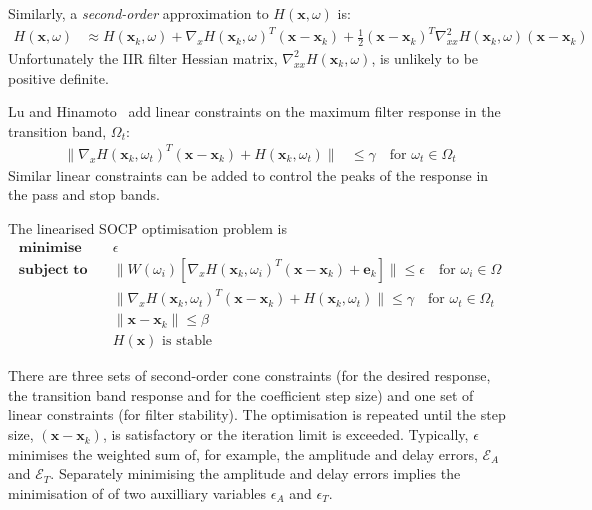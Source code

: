 \documentclass[a4paper,twoside,10pt,english]{report}
\begin{document}
Similarly, a \emph{second-order} approximation to 
$H\left(\boldsymbol{x},\omega\right)$ is:
\begin{align*}
H\left(\boldsymbol{x},\omega\right) &\approx 
H\left(\boldsymbol{x}_{k},\omega\right) + 
\nabla_{x}H\left(\boldsymbol{x}_{k},\omega\right)^{T}
\left(\boldsymbol{x}-\boldsymbol{x}_{k}\right)+ 
\frac{1}{2}\left(\boldsymbol{x}-\boldsymbol{x}_{k}\right)^{T}
\nabla_{xx}^{2}H\left(\boldsymbol{x}_{k},\omega\right)
\left(\boldsymbol{x}-\boldsymbol{x}_{k}\right)
\end{align*}
Unfortunately the IIR filter Hessian matrix, 
$\nabla_{xx}^{2}H\left(\boldsymbol{x}_{k},\omega\right)$, is unlikely to be
positive definite.

Lu and Hinamoto~\cite{LuHinamoto_IIRFrequencyMaskingFiltersConeProgramming} add
linear constraints on the maximum filter response in the transition band, 
$\Omega_{t}$:
\begin{align*}
\|\nabla_{x}H\left(\boldsymbol{x}_{k},\omega_{t}\right)^{T}
\left(\boldsymbol{x}-\boldsymbol{x}_{k}\right) +
H\left(\boldsymbol{x}_{k},\omega_{t}\right)\| &\le 
\gamma\quad \text{for }\omega_{t}\in\Omega_{t}
\end{align*}
Similar linear constraints can be added to control the peaks of the response
in the pass and stop bands.

The linearised SOCP optimisation problem is
\begin{align*}
\textbf{minimise}\quad & \epsilon \\
\textbf{subject to}\quad &\|W\left(\omega_{i}\right)\left[\nabla_{x}
H\left(\boldsymbol{x}_{k},\omega_{i}\right)^{T}
\left(\boldsymbol{x}-\boldsymbol{x}_{k}\right) + \boldsymbol{e}_{k}\right]\|
\le \epsilon\quad \text{for }\omega_{i}\in\Omega\\
&\|\nabla_{x}H\left(\boldsymbol{x}_{k},\omega_{t}\right)^{T}
\left(\boldsymbol{x}-\boldsymbol{x}_{k}\right) +
H\left(\boldsymbol{x}_{k},\omega_{t}\right)\| \le 
\gamma\quad \text{for }\omega_{t}\in\Omega_{t}\\
&\|\boldsymbol{x}-\boldsymbol{x}_{k}\| \le \beta\\
&H\left(\boldsymbol{x}\right) \text{ is stable} 
\end{align*}

There are three sets of second-order cone constraints (for the desired response,
the transition band response  and for the coefficient step size) and one set of
linear constraints (for filter stability). The optimisation is repeated until
the step size, $\left(\boldsymbol{x}-\boldsymbol{x}_{k}\right)$, is satisfactory
or the iteration limit is exceeded. Typically, $\epsilon$ minimises the weighted
sum of, for example, the amplitude and delay errors, $\mathcal{E}_{A}$ and 
$\mathcal{E}_{T}$. Separately minimising the amplitude and delay errors implies
the minimisation of of two auxilliary variables $\epsilon_{A}$ and $\epsilon_{T}$.
\end{document}
